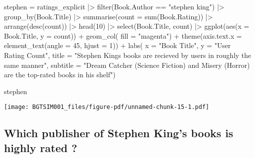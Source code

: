 \documentclass[
]{report}
\newenvironment{Shaded}{\begin{snugshade}}{\end{snugshade}}
\newcommand{\AttributeTok}[1]{\textcolor[rgb]{0.40,0.45,0.13}{#1}}
\newcommand{\DecValTok}[1]{\textcolor[rgb]{0.68,0.00,0.00}{#1}}
\newcommand{\FunctionTok}[1]{\textcolor[rgb]{0.28,0.35,0.67}{#1}}
\newcommand{\NormalTok}[1]{\textcolor[rgb]{0.00,0.23,0.31}{#1}}
\newcommand{\OtherTok}[1]{\textcolor[rgb]{0.00,0.23,0.31}{#1}}
\newcommand{\SpecialCharTok}[1]{\textcolor[rgb]{0.37,0.37,0.37}{#1}}
\newcommand{\StringTok}[1]{\textcolor[rgb]{0.13,0.47,0.30}{#1}}
\begin{document}
\begin{Shaded}
\begin{Highlighting}[]
\NormalTok{stephen }\OtherTok{=}\NormalTok{ ratings\_explicit }\SpecialCharTok{|\textgreater{}} \FunctionTok{filter}\NormalTok{(Book.Author }\SpecialCharTok{==} \StringTok{"stephen king"}\NormalTok{) }\SpecialCharTok{|\textgreater{}} 
                            \FunctionTok{group\_by}\NormalTok{(Book.Title) }\SpecialCharTok{|\textgreater{}}
                            \FunctionTok{summarise}\NormalTok{(}\AttributeTok{count =} \FunctionTok{sum}\NormalTok{(Book.Rating)) }\SpecialCharTok{|\textgreater{}} 
                            \FunctionTok{arrange}\NormalTok{(}\FunctionTok{desc}\NormalTok{(count)) }\SpecialCharTok{|\textgreater{}} \FunctionTok{head}\NormalTok{(}\DecValTok{10}\NormalTok{) }\SpecialCharTok{|\textgreater{}}
                            \FunctionTok{select}\NormalTok{(Book.Title, count) }\SpecialCharTok{|\textgreater{}}
                            \FunctionTok{ggplot}\NormalTok{(}\FunctionTok{aes}\NormalTok{(}\AttributeTok{x =}\NormalTok{ Book.Title, }\AttributeTok{y =}\NormalTok{ count)) }\SpecialCharTok{+}
                               \FunctionTok{geom\_col}\NormalTok{( }\AttributeTok{fill =} \StringTok{"magenta"}\NormalTok{) }\SpecialCharTok{+}
                               \FunctionTok{theme}\NormalTok{(}\AttributeTok{axis.text.x =} \FunctionTok{element\_text}\NormalTok{(}\AttributeTok{angle =} \DecValTok{45}\NormalTok{, }\AttributeTok{hjust =} \DecValTok{1}\NormalTok{)) }\SpecialCharTok{+} \FunctionTok{labs}\NormalTok{( }\AttributeTok{x =} \StringTok{"Book Title"}\NormalTok{, }
           \AttributeTok{y =} \StringTok{"User Rating Count"}\NormalTok{,}
           \AttributeTok{title =} \StringTok{"Stephen King\textquotesingle{}s books are recieved by users in roughly the same manner"}\NormalTok{,}
           \AttributeTok{subtitle =} \StringTok{"Dream Catcher (Science Fiction) and Misery (Horror) are the top{-}rated books in his shelf"}\NormalTok{)}

\NormalTok{stephen    }
\end{Highlighting}
\end{Shaded}

\texttt{[image: BGTSIM001\_files/figure-pdf/unnamed-chunk-15-1.pdf]}

\subsection{Which publisher of Stephen King's books is highly rated
?}\label{which-publisher-of-stephen-kings-books-is-highly-rated}
\end{document}
